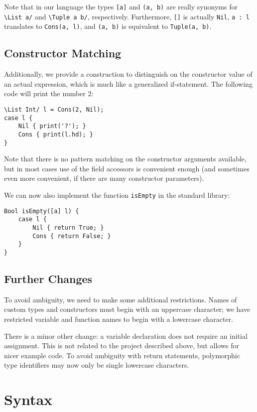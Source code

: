 \documentclass[a4paper]{article}
\begin{document}
Note that in our language the types \verb+[a]+ and \verb+(a, b)+ are really synonyms for \verb+\List a/+ and \verb+\Tuple a b/+, respectively.
Furthermore, \verb+[]+ is actually \verb+Nil+, \verb+a : l+ translates to \verb+Cons(a, l)+, and \verb+(a, b)+ is equivalent to \verb+Tuple(a, b)+.

\subsection{Constructor Matching}

Additionally, we provide a construction to distinguish on the constructor value of an actual expression, which is much like a generalized if-statement.
The following code will print the number $2$:
\begin{verbatim}
\List Int/ l = Cons(2, Nil);
case l {
    Nil { print('?'); }
    Cons { print(l.hd); }
}\end{verbatim}
Note that there is no pattern matching on the constructor arguments available, but in most cases use of the field accessors is convenient enough (and sometimes even more convenient, if there are many constructor parameters).

We can now also implement the function \verb+isEmpty+ in the standard library:
\begin{verbatim}
Bool isEmpty([a] l) {
    case l {
        Nil { return True; }
        Cons { return False; }
    }
}\end{verbatim}

\subsection{Further Changes}

To avoid ambiguity, we need to make some additional restrictions.
Names of custom types and constructors must begin with an uppercase character; we have restricted variable and function names to begin with a lowercase character.

There is a minor other change: a variable declaration does not require an initial assignment.
This is not related to the project described above, but allows for nicer example code.
To avoid ambiguity with return statements, polymorphic type identifiers may now only be single lowercase characters.

\section{Syntax}
\end{document}
